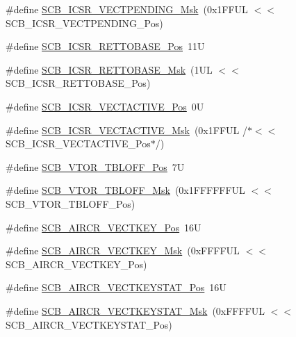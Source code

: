\begin{DoxyCompactItemize}
\item 
\#define \hyperlink{group___c_m_s_i_s___s_c_b_gacb6992e7c7ddc27a370f62878a21ef72}{S\-C\-B\-\_\-\-I\-C\-S\-R\-\_\-\-V\-E\-C\-T\-P\-E\-N\-D\-I\-N\-G\-\_\-\-Msk}~(0x1\-F\-F\-U\-L $<$$<$ S\-C\-B\-\_\-\-I\-C\-S\-R\-\_\-\-V\-E\-C\-T\-P\-E\-N\-D\-I\-N\-G\-\_\-\-Pos)
\item 
\#define \hyperlink{group___c_m_s_i_s___s_c_b_ga403d154200242629e6d2764bfc12a7ec}{S\-C\-B\-\_\-\-I\-C\-S\-R\-\_\-\-R\-E\-T\-T\-O\-B\-A\-S\-E\-\_\-\-Pos}~11\-U
\item 
\#define \hyperlink{group___c_m_s_i_s___s_c_b_gaca6fc3f79bb550f64fd7df782ed4a5f6}{S\-C\-B\-\_\-\-I\-C\-S\-R\-\_\-\-R\-E\-T\-T\-O\-B\-A\-S\-E\-\_\-\-Msk}~(1\-U\-L $<$$<$ S\-C\-B\-\_\-\-I\-C\-S\-R\-\_\-\-R\-E\-T\-T\-O\-B\-A\-S\-E\-\_\-\-Pos)
\item 
\#define \hyperlink{group___c_m_s_i_s___s_c_b_gae4f602c7c5c895d5fb687b71b0979fc3}{S\-C\-B\-\_\-\-I\-C\-S\-R\-\_\-\-V\-E\-C\-T\-A\-C\-T\-I\-V\-E\-\_\-\-Pos}~0\-U
\item 
\#define \hyperlink{group___c_m_s_i_s___s_c_b_ga5533791a4ecf1b9301c883047b3e8396}{S\-C\-B\-\_\-\-I\-C\-S\-R\-\_\-\-V\-E\-C\-T\-A\-C\-T\-I\-V\-E\-\_\-\-Msk}~(0x1\-F\-F\-U\-L /$\ast$$<$$<$ S\-C\-B\-\_\-\-I\-C\-S\-R\-\_\-\-V\-E\-C\-T\-A\-C\-T\-I\-V\-E\-\_\-\-Pos$\ast$/)
\item 
\#define \hyperlink{group___c_m_s_i_s___s_c_b_gac6a55451ddd38bffcff5a211d29cea78}{S\-C\-B\-\_\-\-V\-T\-O\-R\-\_\-\-T\-B\-L\-O\-F\-F\-\_\-\-Pos}~7\-U
\item 
\#define \hyperlink{group___c_m_s_i_s___s_c_b_ga75e395ed74042923e8c93edf50f0996c}{S\-C\-B\-\_\-\-V\-T\-O\-R\-\_\-\-T\-B\-L\-O\-F\-F\-\_\-\-Msk}~(0x1\-F\-F\-F\-F\-F\-F\-U\-L $<$$<$ S\-C\-B\-\_\-\-V\-T\-O\-R\-\_\-\-T\-B\-L\-O\-F\-F\-\_\-\-Pos)
\item 
\#define \hyperlink{group___c_m_s_i_s___s_c_b_gaaa27c0ba600bf82c3da08c748845b640}{S\-C\-B\-\_\-\-A\-I\-R\-C\-R\-\_\-\-V\-E\-C\-T\-K\-E\-Y\-\_\-\-Pos}~16\-U
\item 
\#define \hyperlink{group___c_m_s_i_s___s_c_b_ga90c7cf0c490e7ae55f9503a7fda1dd22}{S\-C\-B\-\_\-\-A\-I\-R\-C\-R\-\_\-\-V\-E\-C\-T\-K\-E\-Y\-\_\-\-Msk}~(0x\-F\-F\-F\-F\-U\-L $<$$<$ S\-C\-B\-\_\-\-A\-I\-R\-C\-R\-\_\-\-V\-E\-C\-T\-K\-E\-Y\-\_\-\-Pos)
\item 
\#define \hyperlink{group___c_m_s_i_s___s_c_b_gaec404750ff5ca07f499a3c06b62051ef}{S\-C\-B\-\_\-\-A\-I\-R\-C\-R\-\_\-\-V\-E\-C\-T\-K\-E\-Y\-S\-T\-A\-T\-\_\-\-Pos}~16\-U
\item 
\#define \hyperlink{group___c_m_s_i_s___s_c_b_gabacedaefeefc73d666bbe59ece904493}{S\-C\-B\-\_\-\-A\-I\-R\-C\-R\-\_\-\-V\-E\-C\-T\-K\-E\-Y\-S\-T\-A\-T\-\_\-\-Msk}~(0x\-F\-F\-F\-F\-U\-L $<$$<$ S\-C\-B\-\_\-\-A\-I\-R\-C\-R\-\_\-\-V\-E\-C\-T\-K\-E\-Y\-S\-T\-A\-T\-\_\-\-Pos)
$$
\end{DoxyCompactItemize}
